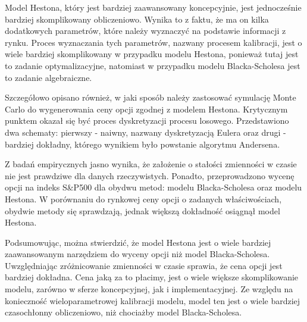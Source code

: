 \documentclass{pracamgr}
\begin{document}
Model Hestona, który jest bardziej zaawansowany koncepcyjnie, jest jednocześnie 
bardziej skomplikowany obliczeniowo. Wynika to z faktu, że ma on kilka dodatkowych
parametrów, które należy wyznaczyć na podstawie informacji z rynku. Proces wyznaczania tych 
parametrów, nazwany procesem kalibracji, jest o wiele bardziej skomplikowany w przypadku 
modelu Hestona, ponieważ tutaj jest to zadanie optymalizacyjne, natomiast w przypadku modelu
Blacka-Scholesa jest to zadanie algebraiczne.

Szczegółowo opisano również, w jaki sposób należy zastosować symulację Monte Carlo do 
wygenerowania ceny opcji zgodnej z modelem Hestona. Krytycznym punktem okazał się być
proces dyskretyzacji procesu losowego. Przedstawiono dwa schematy: pierwszy - naiwny, nazwany
dyskretyzacją Eulera oraz drugi - bardziej dokładny, którego wynikiem było powstanie 
algorytmu Andersena. 

Z badań empirycznych jasno wynika, że założenie o stałości zmienności w czasie nie jest 
prawdziwe dla danych rzeczywistych. Ponadto, przeprowadzono wycenę opcji na indeks 
S\&P500 dla obydwu metod: modelu Blacka-Scholesa oraz modelu Hestona. 
W porównaniu do rynkowej ceny opcji o zadanych właściwościach, obydwie metody się 
sprawdzają, jednak większą dokładność osiągnął model Hestona.


Podsumowując, można stwierdzić, że model Hestona jest o wiele bardziej zaawansowanym
narzędziem do wyceny opcji niż model Blacka-Scholesa. Uwzględniając zróżnicowanie zmienności 
w czasie sprawia, że cena opcji jest bardziej dokładna. Cena jaką za to płacimy,
jest o wiele większe skomplikowanie modelu, zarówno w sferze koncepcyjnej, jak i 
implementacyjnej. Ze względu na konieczność wieloparametrowej kalibracji modelu, 
model ten jest o wiele bardziej czasochłonny obliczeniowo, niż chociażby model Blacka-Scholesa.

\cleardoublepage
{}
{}
\cleardoublepage
{}
{}
\cleardoublepage
{}
{}
\cleardoublepage
{}
{}
\end{document}
